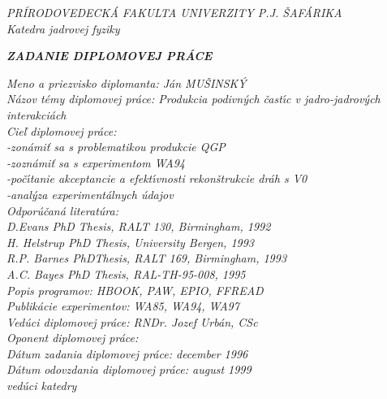 \begin{titlepage}
\parindent 0cm
\begin{center}
  {\it PR\'IRODOVEDECK\'A FAKULTA UNIVERZITY P.J. \v{S}AF\'ARIKA \\
Katedra jadrovej fyziky} \\
\end{center}
\vspace*{0.5cm}
\begin{center}
  {\it {\bf ZADANIE DIPLOMOVEJ PR\'ACE}}
\end{center}
\vspace*{0.5cm}
{\it Meno a priezvisko diplomanta:  J\'an MU\v{S}INSK\'Y \\

N\'azov t\'emy diplomovej pr\'ace:  Produkcia podivn\'ych \v{c}ast\'{\i}c v jadro-jadrov\'ych \\
\hspace*{5.5cm}interakci\'ach \\

Cie\v{l} diplomovej pr\'ace:  \\
\hspace*{3.5cm} -zon\'ami\v{t} sa s problematikou produkcie QGP \\ 
\hspace*{3.5cm} -zozn\'ami\v{t} sa s experimentom WA94 \\ 
\hspace*{3.5cm} -po\v{c}\'{\i}tanie akceptancie a efekt\'{\i}vnosti
 rekon\v{s}trukcie dr\'ah s V0 \\  
\hspace*{3.5cm} -anal\'yza experiment\'alnych \'udajov \\


Odpor\'u\v{c}an\'a literat\'ura: \\

D.Evans PhD Thesis, RALT 130, Birmingham, 1992 \\
H. Helstrup PhD Thesis, University Bergen, 1993 \\
R.P. Barnes PhDThesis, RALT 169, Birmingham, 1993 \\
A.C. Bayes PhD Thesis, RAL-TH-95-008, 1995 \\

Popis programov: HBOOK, PAW, EPIO, FFREAD \\
Publik\'acie experimentov: WA85, WA94, WA97 \\

\vspace*{1cm}
Ved\'uci diplomovej pr\'ace: RNDr. Jozef Urb\'an, CSc \\

Oponent diplomovej pr\'ace: \\

D\'atum zadania diplomovej pr\'ace: december 1996 \\

D\'atum odovzdania diplomovej pr\'ace: august 1999 \\

\vspace{1cm}
\hspace*{10cm}
 ved\'uci katedry }
\end{titlepage}
